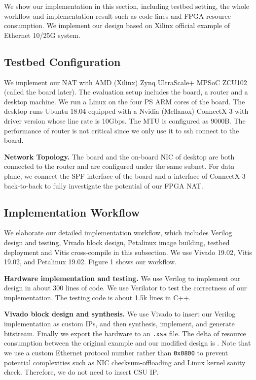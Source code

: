 
We show our implementation in this section, including testbed setting, the whole workflow and implementation result such as code lines and FPGA resource consumption. We implement our design based on Xilinx official example of Ethernet 10/25G system.
\subsection{Testbed Configuration}
We implement our NAT with AMD (Xilinx) Zynq UltraScale+ MPSoC ZCU102 (called the board later). The evaluation setup includes the board, a router and a desktop machine.
We run a Linux  on the four PS ARM cores of the board. 
The desktop runs Ubuntu 18.04 equipped with a Nvidia (Mellanox) ConnectX-3 
with driver version  whose line rate is 10Gbps. The MTU is configured as 9000B.
The performance of router is not critical since we only use it to ssh connect to the board.

\textbf{Network Topology.} 
The board and the on-board NIC of desktop are both connected to the router and 
are configured under the same subnet. 
For data plane, we connect the SPF interface of the board and a interface of ConnectX-3 back-to-back to fully investigate the potential of our FPGA NAT.

\subsection{Implementation Workflow}

We elaborate our detailed implementation workflow, which includes Verilog design and testing, Vivado block design, Petalinux image building, testbed deployment and Vitis cross-compile in this subsection. We use Vivado 19.02, Vitis 19.02, and Petalinux 19.02. Figure 1 shows our workflow.

\textbf{Hardware implementation and testing.} We use Verilog to implement our design in about 300 lines of code. We use Verilator to test the correctness of our implementation.
The testing code is about 1.5k lines in C++.

\textbf{Vivado block design and synthesis.} We use Vivado to insert our Verilog implementation as custom IPs, and then synthesis, implement, and generate bitstream. Finally we export the hardware to an \verb|.xsa| file. The delta of resource consumption between the original example and our modified design is . 
Note that we use a custom Ethernet protocol number rather than \verb|0x0800| to prevent potential complexities such as NIC checksum-offloading and Linux kernel sanity check. Therefore, we do not need to insert CSU IP.

